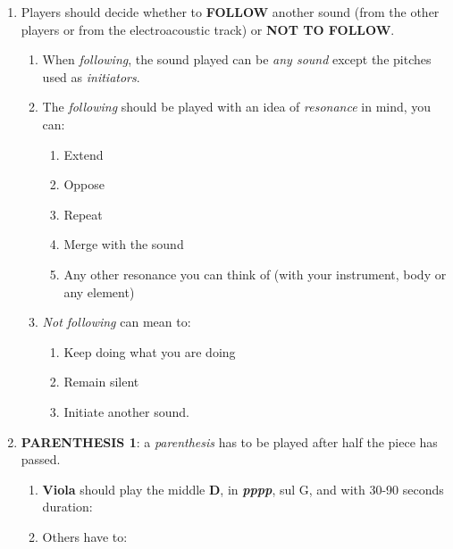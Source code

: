\begin{enumerate}
\def\labelenumi{\arabic{enumi}.}
\item
  Players should decide whether to \textbf{FOLLOW} another sound (from
  the other players or from the electroacoustic track) or \textbf{NOT TO
  FOLLOW}.

  \begin{enumerate}
  \def\labelenumii{\arabic{enumii}.}
  \item
    When \emph{following}, the sound played can be \emph{any sound}
    except the pitches used as \emph{initiators}.
  \item
    The \emph{following} should be played with an idea of
    \emph{resonance} in mind, you can:

    \begin{enumerate}
    \def\labelenumiii{\arabic{enumiii}.}
    \item
      Extend
    \item
      Oppose
    \item
      Repeat
    \item
      Merge with the sound
    \item
      Any other resonance you can think of (with your instrument, body
      or any element)
    \end{enumerate}
  \item
    \emph{Not following} can mean to:

    \begin{enumerate}
    \def\labelenumiii{\arabic{enumiii}.}
    \item
      Keep doing what you are doing
    \item
      Remain silent
    \item
      Initiate another sound.
    \end{enumerate}
  \end{enumerate}
\item
  \textbf{PARENTHESIS 1}: a \emph{parenthesis} has to be played after
  half the piece has passed.

  \begin{enumerate}
  \def\labelenumii{\arabic{enumii}.}
  \item
    \textbf{Viola} should play the middle \textbf{D}, in
    \emph{\textbf{pppp}}, sul G, and with 30-90 seconds duration:
  \item
    Others have to:


\end{enumerate}
\end{enumerate}
